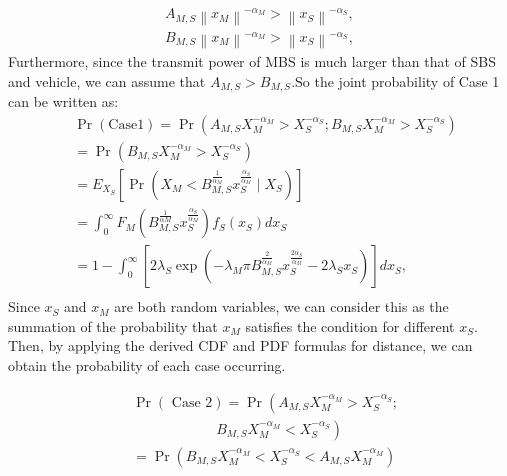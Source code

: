 \documentclass[conference]{IEEEtran}
\begin{document}
\begin{CJK*}{UTF8}{bsmi}
\begin{equation}
\begin{aligned}
A_{M, S}\left\|x_M\right\|^{-\alpha_M}>\left\|x_S\right\|^{-\alpha_S},\\
B_{M, S}\left\|x_M\right\|^{-\alpha_M}>\left\|x_S\right\|^{-\alpha_S},
\end{aligned}
\end{equation}
%
Furthermore, since the transmit power of MBS is much larger than that of SBS and vehicle, we can assume that $A_{M, S}> B_{M, S}$.So the joint probability of Case 1 can be written as:
\begin{equation}
\begin{aligned}
&\operatorname{Pr}(\text {Case} 1)=\operatorname{Pr}(A_{M, S} X_M^{-\alpha_M}>X_S^{-\alpha_S} ;B_{M, S} X_M^{-\alpha_M}>X_S^{-\alpha_S}) \\
&=\operatorname{Pr}\left(B_{M, S} X_M^{-\alpha_M}>X_S^{-\alpha_S}\right) \\
&=E_{X_S}\left[\operatorname{Pr}\left(X_M<B_{M, S}^{\frac{1}{\alpha_M}} x_S^{\frac{\alpha_S}{\alpha_M}} \mid X_S\right)\right] \\
&=\int_0^{\infty} F_M\left(B_{M, S}^{\frac{1}{\alpha M}} x_S^{\frac{\alpha_S}{\alpha_M}}\right) f_S\left(x_S\right) d x_S \\
& = 1-\int_0^{\infty}\left[2 \lambda_S \exp \left(-\lambda_M \pi B_{M, S}^{\frac{2}{\alpha_M}} x_S^{\frac{2 \alpha_S}{\alpha_M}}-2 \lambda_S x_S\right)\right] d x_S, \\
\end{aligned}
\end{equation}
Since $x_S$ and $x_M$ are both random variables, we can consider this as the summation of the probability that $x_M$ satisfies the condition for different $x_S$. Then, by applying the derived CDF and PDF formulas for distance, we can obtain the probability of each case occurring.

\begin{equation}
\begin{aligned}
&\operatorname{Pr}(\text { Case } 2)=\operatorname{Pr}\left(A_{M, S} X_M^{-\alpha_M}>X_S^{-\alpha_S} ;\right. \\
&\qquad\qquad\qquad \left.B_{M, S}X_M^{-\alpha_M}<X_S^{-\alpha_S}\right)\\ 
&= \operatorname{Pr}\left(B_{M, S} X_M^{-\alpha_M}<X_S^{-\alpha_S}<A_{M, S} X_M^{-\alpha_M}\right) \\
\end{aligned}
\end{equation}




\end{CJK*}
\end{document}
